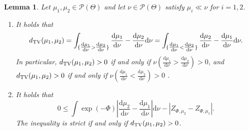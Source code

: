 \documentclass[a4paper]{scrartcl}
\newtheorem{lemma}[theorem]{Lemma}
\theoremstyle{definition}
\numberwithin{equation}{section}
\newcommand{\rd}{\mathrm{d}}
\newcommand{\Abs}[1]{\left\vert#1\right\vert}
\newcommand{\TV}[0]{\textup{TV}}
\begin{document}
 \begin{lemma}
 \label{lemma_L1norm_difference_of_unnormalised_likelihoods_minus_abs_diff_normalisation_constants_prior_perturbation}
 Let $\mu_1,\mu_2\in\mathcal{P}(\Theta)$ and let $\nu\in\mathcal{P}(\Theta)$ satisfy $\mu_i\ll\nu$ for $i=1,2$. 
\begin{enumerate}
 \item \label{lemma_L1norm_difference_of_unnormalised_likelihoods_minus_abs_diff_normalisation_constants_prior_perturbation_item1}
 It holds that
 \begin{equation*}
  d_{\TV}(\mu_1,\mu_2)=\int_{\{\tfrac{\rd\mu_1}{\rd\nu}>\tfrac{\rd\mu_2}{\rd\nu}\}} \frac{\rd\mu_1}{\rd\nu}-\frac{\rd\mu_2}{\rd\nu} \rd \nu=\int_{\{\tfrac{\rd\mu_1}{\rd\nu}<\tfrac{\rd\mu_2}{\rd\nu}\}} \frac{\rd\mu_2}{\rd\nu}-\frac{\rd\mu_1}{\rd\nu} \rd \nu.
 \end{equation*}
 In particular, $d_{\TV}(\mu_1,\mu_2)>0$ if and only if $\nu(\tfrac{\rd\mu_1}{\rd\nu}>\tfrac{\rd\mu_2}{\rd\nu})>0$, and $d_{\TV}(\mu_1,\mu_2)>0$ if and only if $\nu(\tfrac{\rd\mu_1}{\rd\nu}<\tfrac{\rd\mu_2}{\rd\nu})>0$ .
 \item \label{lemma_L1norm_difference_of_unnormalised_likelihoods_minus_abs_diff_normalisation_constants_prior_perturbation_item2}
 It holds that
 \begin{equation*}
  0\leq \int \exp(-\Phi)\Abs{\frac{\rd\mu_2}{\rd\nu}-\frac{\rd\mu_1}{\rd\nu}}\rd \nu-\Abs{Z_{\Phi,\mu_2}-Z_{\Phi,\mu_1}}.
 \end{equation*}
The inequality is strict if and only if $d_{\TV}(\mu_1,\mu_2)>0$.
\end{enumerate}
 \end{lemma}
\end{document}
